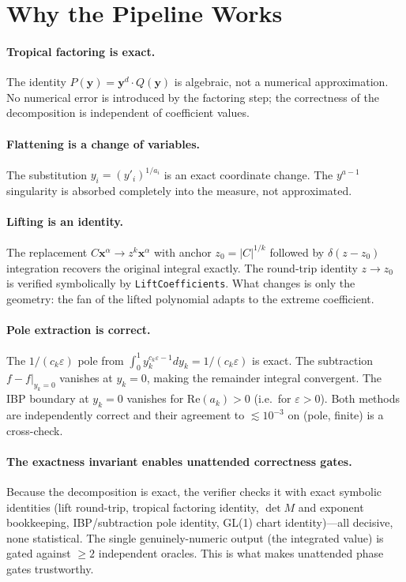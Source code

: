 \documentclass[11pt,a4paper]{article}
\begin{document}
\section{Why the Pipeline Works}

\paragraph{Tropical factoring is exact.} The identity $P(\mathbf{y})=\mathbf{y}^d\cdot Q(\mathbf{y})$ is algebraic, not a numerical approximation. No numerical error is introduced by the factoring step; the correctness of the decomposition is independent of coefficient values.

\paragraph{Flattening is a change of variables.} The substitution $y_i=(y'_i)^{1/a_i}$ is an exact coordinate change. The $y^{a-1}$ singularity is absorbed completely into the measure, not approximated.

\paragraph{Lifting is an identity.} The replacement $C\mathbf{x}^\alpha\to z^k\mathbf{x}^\alpha$ with anchor $z_0=|C|^{1/k}$ followed by $\delta(z-z_0)$ integration recovers the original integral exactly. The round-trip identity $z\to z_0$ is verified symbolically by \texttt{LiftCoefficients}. What changes is only the geometry: the fan of the lifted polynomial adapts to the extreme coefficient.

\paragraph{Pole extraction is correct.} The $1/(c_k\varepsilon)$ pole from $\int_0^1 y_k^{c_k\varepsilon-1}dy_k=1/(c_k\varepsilon)$ is exact. The subtraction $f-f|_{y_k=0}$ vanishes at $y_k=0$, making the remainder integral convergent. The IBP boundary at $y_k=0$ vanishes for $\mathrm{Re}(a_k)>0$ (i.e.\ for $\varepsilon>0$). Both methods are independently correct and their agreement to $\lesssim 10^{-3}$ on (pole, finite) is a cross-check.

\paragraph{The exactness invariant enables unattended correctness gates.} Because the decomposition is exact, the verifier checks it with exact symbolic identities (lift round-trip, tropical factoring identity, $\det M$ and exponent bookkeeping, IBP/subtraction pole identity, GL(1) chart identity)---all decisive, none statistical. The single genuinely-numeric output (the integrated value) is gated against $\geq 2$ independent oracles. This is what makes unattended phase gates trustworthy.
\end{document}
